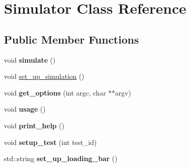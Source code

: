 \hypertarget{classSimulator}{}\section{Simulator Class Reference}
\label{classSimulator}
\subsection*{Public Member Functions}
\begin{DoxyCompactItemize}
\item 
\hypertarget{classSimulator_a6d7bbf2803b741b05d3950bdfb4955dd}{}void {\bfseries simulate} ()\label{classSimulator_a6d7bbf2803b741b05d3950bdfb4955dd}

\item 
void \hyperlink{classSimulator_a288f2c1b39984aaab95db9d7d82b252b}{set\+\_\+up\+\_\+simulation} ()
\item 
\hypertarget{classSimulator_ac3d4b51d953c26e623c0cc4c9eaec25b}{}void {\bfseries get\+\_\+options} (int argc, char $\ast$$\ast$argv)\label{classSimulator_ac3d4b51d953c26e623c0cc4c9eaec25b}

\item 
\hypertarget{classSimulator_a74f4d0e93a78e0450fb540b718302a80}{}void {\bfseries usage} ()\label{classSimulator_a74f4d0e93a78e0450fb540b718302a80}

\item 
\hypertarget{classSimulator_a436108b8ecd4ca2f29188412535ccdfa}{}void {\bfseries print\+\_\+help} ()\label{classSimulator_a436108b8ecd4ca2f29188412535ccdfa}

\item 
\hypertarget{classSimulator_a43afde7de1b67f59de07de387f8a9fac}{}void {\bfseries setup\+\_\+test} (int test\+\_\+id)\label{classSimulator_a43afde7de1b67f59de07de387f8a9fac}

\item 
\hypertarget{classSimulator_af2a1020c6cf47e50f1b48a387b8d0695}{}std\+::string {\bfseries set\+\_\+up\+\_\+loading\+\_\+bar} ()\label{classSimulator_af2a1020c6cf47e50f1b48a387b8d0695}

\end{DoxyCompactItemize}

